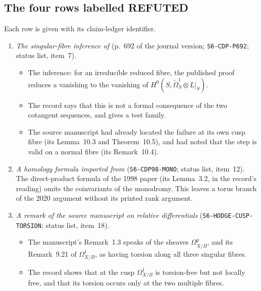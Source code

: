 \subsection{The four rows labelled \textsf{REFUTED}}

Each row is given with its claim-ledger identifier.

\begin{enumerate}[label=\arabic*.]
\item \emph{The singular-fibre inference of \cite{CDP20}} (p.~692 of the journal version; \texttt{S6-CDP-P692}; status list, item~7).
\begin{itemize}
\item The inference: for an irreducible reduced fibre, the published proof reduces a vanishing to the vanishing of $H^0(S,\widetilde\Omega^1_S\otimes L|_S)$.
\item The record says that this is not a formal consequence of the two cotangent sequences, and gives a test family.
\item The source manuscript had already located the failure at its own cusp fibre (its Lemma~10.3 and Theorem~10.5), and had noted that the step is valid on a normal fibre (its Remark~10.4).
\end{itemize}
\item \emph{A homology formula imported from \cite{CDP98}} (\texttt{S6-CDP98-MONO}; status list, item~12). The direct-product formula of the 1998 paper (its Lemma~3.2, in the record's reading) omits the coinvariants of the monodromy. This leaves a torus branch of the 2020 argument without its printed rank argument. 
\item \emph{A remark of the source manuscript on relative differentials} (\texttt{S6-HODGE-CUSP-TORSION}; status list, item~18).
\begin{itemize}
\item The manuscript's Remark~1.3 speaks of the sheaves $\Omega^p_{X/B}$, and its Remark~9.21 of $\Omega^1_{X/B}$, as having torsion along all three singular fibres.
\item The record shows that at the cusp $\Omega^1_{X/B}$ is torsion-free but not locally free, and that its torsion occurs only at the two multiple fibres.

\end{itemize}
\end{enumerate}
